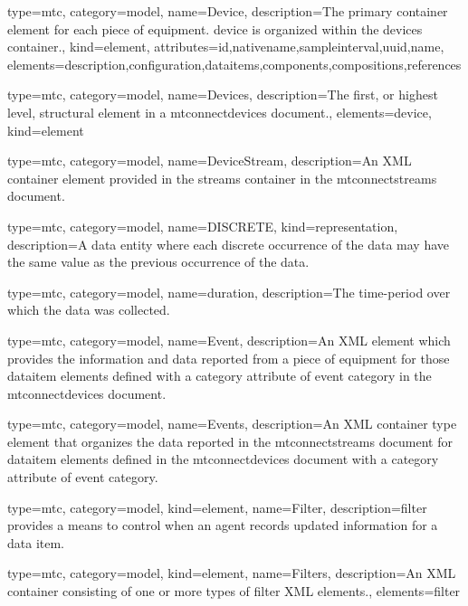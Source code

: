 {
  type=mtc,
  category=model,
  name={Device},
  description={The primary container element for each piece of equipment. \gls{device} is organized within the \gls{devices}  container.},
  kind={element},
  attributes={\gls{id},\gls{nativename},\gls{sampleinterval},\gls{uuid},\gls{name}},
  elements={\gls{description},\gls{configuration},\gls{dataitems},\gls{components},\glspl{composition},\glspl{reference}}
}

{
  type=mtc,
  category=model,
  name={Devices},
  description={The first, or highest level, \gls{structural element} in a \glspl{mtconnectdevice} document.},
  elements={\gls{device}},
  kind={element}
}


{
  type=mtc,
  category=model,
  name={DeviceStream},
  description={An XML container element provided in the \gls{streams} container in the \glspl{mtconnectstream} document.}
}



{
  type=mtc,
  category=model,
  name={DISCRETE},
  kind={representation},
  description={A \gls{data entity} where each discrete occurrence of the data may have the same value as the previous occurrence of the data.}
}


{
  type=mtc,
  category=model,
  name={duration},
  description={The time-period over which the data was collected.}
}



{
  type=mtc,
  category=model,
  name={Event},
  description={An XML element which provides the information and data reported from a piece of equipment for those \gls{dataitem} elements defined with a \gls{category} attribute of \gls{event category} in the \glspl{mtconnectdevice} document.}
}


{
  type=mtc,
  category=model,
  name={Events},
  description={An XML container type element that organizes the data reported in the \glspl{mtconnectstream} document for \gls{dataitem} elements defined in the \glspl{mtconnectdevice} document with a \gls{category} attribute of \gls{event category}.}
}


{
  type=mtc,
  category=model,
  kind={element},
  name={Filter},
  description={\gls{filter} provides a means to control when an \gls{agent} records updated information for a data item.}
}

{
  type=mtc,
  category=model,
  kind={element},
  name={Filters},
  description={An XML container consisting of one or more types of \gls{filter} XML elements.},
  elements={\gls{filter}}
}


